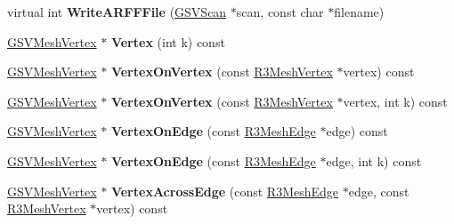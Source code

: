 \begin{DoxyCompactItemize}
\item 
virtual int {\bfseries Write\+A\+R\+F\+F\+File} (\hyperlink{class_g_s_v_scan}{G\+S\+V\+Scan} $\ast$scan, const char $\ast$filename)\hypertarget{class_g_s_v_mesh_a83fae5404000dc89fb3c9982bd1b5221}{}\label{class_g_s_v_mesh_a83fae5404000dc89fb3c9982bd1b5221}

\item 
\hyperlink{class_g_s_v_mesh_vertex}{G\+S\+V\+Mesh\+Vertex} $\ast$ {\bfseries Vertex} (int k) const \hypertarget{class_g_s_v_mesh_aa76e1ab14bdac3e1c426e8bd34d98b6e}{}\label{class_g_s_v_mesh_aa76e1ab14bdac3e1c426e8bd34d98b6e}

\item 
\hyperlink{class_g_s_v_mesh_vertex}{G\+S\+V\+Mesh\+Vertex} $\ast$ {\bfseries Vertex\+On\+Vertex} (const \hyperlink{class_r3_mesh_vertex}{R3\+Mesh\+Vertex} $\ast$vertex) const \hypertarget{class_g_s_v_mesh_a8e93864d1ebfe0949ef500e18038b55b}{}\label{class_g_s_v_mesh_a8e93864d1ebfe0949ef500e18038b55b}

\item 
\hyperlink{class_g_s_v_mesh_vertex}{G\+S\+V\+Mesh\+Vertex} $\ast$ {\bfseries Vertex\+On\+Vertex} (const \hyperlink{class_r3_mesh_vertex}{R3\+Mesh\+Vertex} $\ast$vertex, int k) const \hypertarget{class_g_s_v_mesh_a65e06249b8b2cbeba9bdb0a50d765058}{}\label{class_g_s_v_mesh_a65e06249b8b2cbeba9bdb0a50d765058}

\item 
\hyperlink{class_g_s_v_mesh_vertex}{G\+S\+V\+Mesh\+Vertex} $\ast$ {\bfseries Vertex\+On\+Edge} (const \hyperlink{class_r3_mesh_edge}{R3\+Mesh\+Edge} $\ast$edge) const \hypertarget{class_g_s_v_mesh_a813f93478de4fdd477c80ce7c3df4751}{}\label{class_g_s_v_mesh_a813f93478de4fdd477c80ce7c3df4751}

\item 
\hyperlink{class_g_s_v_mesh_vertex}{G\+S\+V\+Mesh\+Vertex} $\ast$ {\bfseries Vertex\+On\+Edge} (const \hyperlink{class_r3_mesh_edge}{R3\+Mesh\+Edge} $\ast$edge, int k) const \hypertarget{class_g_s_v_mesh_abe8ef82dc24c3c631987244d794e5b0f}{}\label{class_g_s_v_mesh_abe8ef82dc24c3c631987244d794e5b0f}

\item 
\hyperlink{class_g_s_v_mesh_vertex}{G\+S\+V\+Mesh\+Vertex} $\ast$ {\bfseries Vertex\+Across\+Edge} (const \hyperlink{class_r3_mesh_edge}{R3\+Mesh\+Edge} $\ast$edge, const \hyperlink{class_r3_mesh_vertex}{R3\+Mesh\+Vertex} $\ast$vertex) const \hypertarget{class_g_s_v_mesh_a11322e655e8d70ca199bdad404fc50f3}{}\label{class_g_s_v_mesh_a11322e655e8d70ca199bdad404fc50f3}


\end{DoxyCompactItemize}
